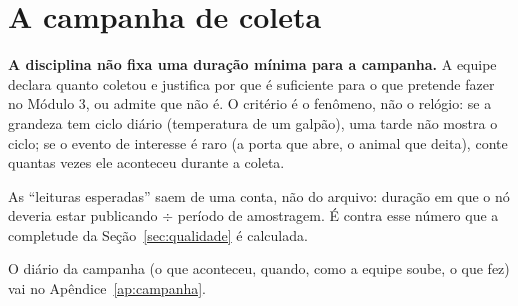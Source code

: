 \section{A campanha de coleta}
\label{sec:campanha}
\rubricaRobustez

\begin{orientacao}
\textbf{A disciplina não fixa uma duração mínima para a campanha.} A
equipe declara quanto coletou e justifica por que é suficiente para o
que pretende fazer no Módulo 3, ou admite que não é. O critério é o
fenômeno, não o relógio: se a grandeza tem ciclo diário (temperatura de
um galpão), uma tarde não mostra o ciclo; se o evento de interesse é
raro (a porta que abre, o animal que deita), conte quantas vezes ele
aconteceu durante a coleta.

As \enquote{leituras esperadas} saem de uma conta, não do arquivo:
duração em que o nó deveria estar publicando $\div$ período de
amostragem. É contra esse número que a completude da
Seção~\ref{sec:qualidade} é calculada.

O diário da campanha (o que aconteceu, quando, como a equipe soube, o
que fez) vai no Apêndice~\ref{ap:campanha}.
\end{orientacao}

